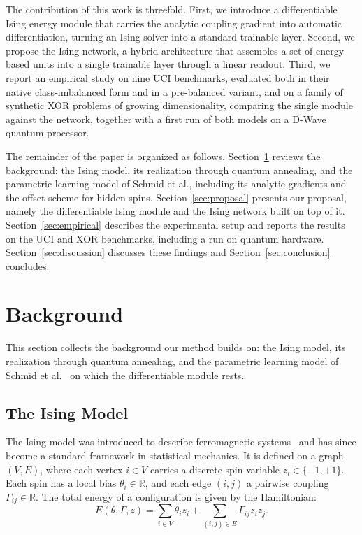 \documentclass{ieeeaccess}
\begin{document}
The contribution of this work is threefold. First, we introduce a
differentiable Ising energy module that carries the analytic coupling
gradient into automatic differentiation, turning an Ising solver into a
standard trainable layer. Second, we propose the Ising network, a hybrid
architecture that assembles a set of energy-based units into a single
trainable layer through a linear readout. Third, we report an empirical study
on nine UCI benchmarks, evaluated both in their native class-imbalanced form
and in a pre-balanced variant, and on a family of synthetic XOR problems of
growing dimensionality, comparing the single module against the network,
together with a first run of both models on a D-Wave quantum processor.

The remainder of the paper is organized as follows.
Section~\ref{sec:background} reviews the background: the Ising model, its
realization through quantum annealing, and the parametric learning model of
Schmid et al., including its analytic gradients and the offset scheme for
hidden spins. Section~\ref{sec:proposal} presents our proposal, namely the
differentiable Ising module and the Ising network built on top of it.
Section~\ref{sec:empirical} describes the experimental setup and reports the
results on the UCI and XOR benchmarks, including a run on quantum hardware.
Section~\ref{sec:discussion} discusses
these findings and Section~\ref{sec:conclusion} concludes.

\section{Background}\label{sec:background}
This section collects the background our method builds on: the Ising model,
its realization through quantum annealing, and the parametric learning model
of Schmid et al.~\cite{10.21468/SciPostPhysCore.7.1.013} on which the
differentiable module rests.

\subsection{The Ising Model}
The Ising model was introduced to describe ferromagnetic
systems~\cite{Ising1925} and has since become a standard
framework in statistical mechanics. It is defined on a graph \( (V, E) \),
where each vertex \( i \in V \) carries a discrete spin variable
\( z_i \in \{-1, +1\} \). Each spin has a local bias \( \theta_i \in \mathbb{R} \),
and each edge \( (i, j) \) a pairwise coupling \( \Gamma_{ij} \in \mathbb{R} \).
The total energy of a configuration is given by the Hamiltonian:
\begin{equation}\label{eq:ising}
    E(\theta, \Gamma, z) = \sum_{i \in V} \theta_i z_i + \sum_{(i,j) \in E} \Gamma_{ij} z_i z_j.
\end{equation} 
\end{document}
